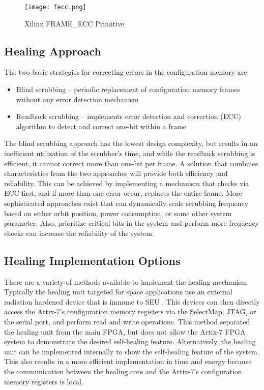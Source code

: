 \begin{figure}[!ht]
    \center
        \texttt{[image: fecc.png]}
        \caption{Xilinx FRAME\_ECC Primitive \cite{vhdl.xilinx}}
    \label{fig:fecc}
\end{figure}

\subsection{Healing Approach}
The two basic strategies for correcting errors in the configuration memory are: 

\begin{itemize}
    \item Blind scrubbing -- periodic replacement of configuration memory frames without any error detection mechanism 
    \item Readback scrubbing -- implements error detection and correction (ECC) algorithm to detect and correct one-bit within a frame \cite{Brosser2014}
\end{itemize}

The blind scrubbing approach has the lowest design complexity, but results in an inefficient utilization of the scrubber's time, and while the readback scrubbing is efficient, it cannot correct more than one-bit per frame. A solution that combines characteristics from the two approaches will provide both efficiency and reliability. This can be achieved by implementing a mechanism that checks via ECC first, and if more than one error occur, replaces the entire frame. More sophisticated approaches exist that can dynamically scale scrubbing frequency based on either orbit position, power consumption, or some other system parameter. Also, prioritize critical bits in the system and perform more frequency checks can increase the reliability of the system.  

\subsection{Healing Implementation Options}
There are a variety of methods available to implement the healing mechanism. Typically the healing unit targeted for space applications use an external radiation hardened device that is immune to SEU \cite{Brosser2014}. This devices can then directly access the Artix-7's configuration memory registers via the SelectMap, JTAG, or the serial port, and perform read and write operations. This method separated the healing unit from the main FPGA, but does not allow the Artix-7 FPGA system to demonstrate the desired self-healing feature. Alternatively, the healing unit can be implemented internally to show the self-healing feature of the system. This also results in a more efficient implementation in time and energy because the communication between the healing core and the Artix-7's configuration memory registers is local.  

